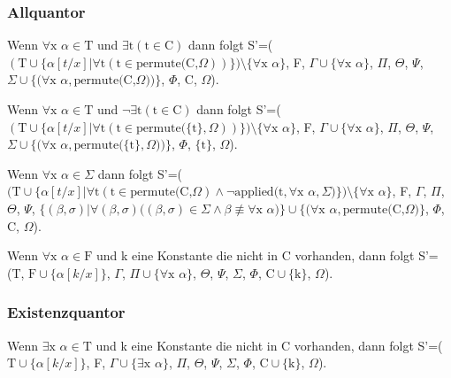 \subsubsection{Allquantor}
Wenn $\forall\textrm{x}$ $\alpha\in\textrm{T}$ und $\exists\textrm{t}(\textrm{t}\in\textrm{C})$ dann folgt S'=($(\textrm{T}\cup\lbrace\alpha[t/x]|\forall\textrm{t}(\textrm{t}\in\textrm{permute(C,}\Omega))\rbrace)\setminus\lbrace\forall\textrm{x}$ $\alpha\rbrace$, F, $\Gamma\cup\lbrace\forall\textrm{x}$ $\alpha\rbrace$, $\Pi$, $\Theta$, $\Psi$, $\Sigma\cup\lbrace(\forall\textrm{x}$ $\alpha,\textrm{permute(C,}\Omega))\rbrace$, $\Phi$, C, $\Omega$).

Wenn $\forall\textrm{x}$ $\alpha\in\textrm{T}$ und $\neg\exists\textrm{t}(\textrm{t}\in\textrm{C})$ dann folgt S'=($(\textrm{T}\cup\lbrace\alpha[t/x]|\forall\textrm{t}(\textrm{t}\in\textrm{permute(}\lbrace\textrm{t}\rbrace,\Omega))\rbrace)\setminus\lbrace\forall\textrm{x}$ $\alpha\rbrace$, F, $\Gamma\cup\lbrace\forall\textrm{x}$ $\alpha\rbrace$, $\Pi$, $\Theta$, $\Psi$, $\Sigma\cup\lbrace(\forall\textrm{x}$ $\alpha,\textrm{permute(}\lbrace\textrm{t}\rbrace,\Omega))\rbrace$, $\Phi$, $\lbrace\textrm{t}\rbrace$, $\Omega$).

Wenn $\forall\textrm{x}$ $\alpha\in\Sigma$ dann folgt S'=($(\textrm{T}\cup\lbrace\alpha[t/x]|\forall\textrm{t}(\textrm{t}\in\textrm{permute(C,}\Omega)\wedge\neg\textrm{applied(t},\forall\textrm{x}$ $\alpha, \Sigma)\rbrace)\setminus\lbrace\forall\textrm{x}$ $\alpha\rbrace$, F, $\Gamma$, $\Pi$, $\Theta$, $\Psi$, $\lbrace(\beta,\sigma)|\forall(\beta,\sigma)((\beta,\sigma)\in\Sigma\wedge\beta \not\equiv \forall\textrm{x}$ $\alpha)\rbrace\cup\lbrace(\forall\textrm{x}$ $\alpha,\textrm{permute(C,}\Omega)\rbrace$, $\Phi$, C, $\Omega$).

Wenn $\forall\textrm{x}$ $\alpha\in\textrm{F}$ und k eine Konstante die nicht in C vorhanden, dann folgt S'=(T, $\textrm{F}\cup\lbrace\alpha[k/x]\rbrace$, $\Gamma$, $\Pi\cup\lbrace\forall\textrm{x}$ $\alpha\rbrace$, $\Theta$, $\Psi$, $\Sigma$, $\Phi$, $\textrm{C}\cup\lbrace\textrm{k}\rbrace$, $\Omega$).

\subsubsection{Existenzquantor}
Wenn $\exists\textrm{x}$ $\alpha\in\textrm{T}$ und k eine Konstante die nicht in C vorhanden, dann folgt S'=($\textrm{T}\cup\lbrace\alpha[k/x]\rbrace$, F, $\Gamma\cup\lbrace\exists\textrm{x}$ $\alpha\rbrace$, $\Pi$, $\Theta$, $\Psi$, $\Sigma$, $\Phi$, $\textrm{C}\cup\lbrace\textrm{k}\rbrace$, $\Omega$).

